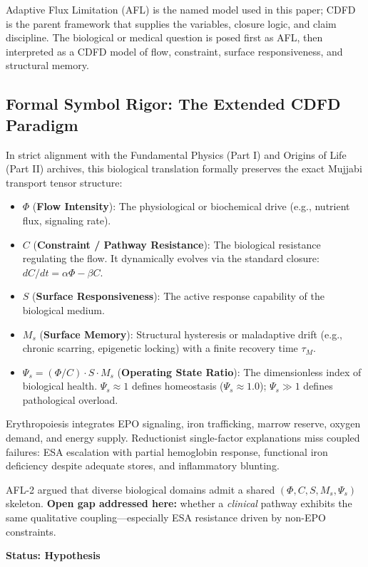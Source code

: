 \documentclass[11pt]{article}
\begin{document}
Adaptive Flux Limitation (AFL) is the named model used in this paper; CDFD is the parent framework that supplies the variables, closure logic, and claim discipline. The biological or medical question is posed first as AFL, then interpreted as a CDFD model of flow, constraint, surface responsiveness, and structural memory.

\subsection{Formal Symbol Rigor: The Extended CDFD Paradigm}
In strict alignment with the Fundamental Physics (Part I) and Origins of Life (Part II) archives, this biological translation formally preserves the exact Mujjabi transport tensor structure:
\begin{itemize}
    \item $\Phi$ (\textbf{Flow Intensity}): The physiological or biochemical drive (e.g., nutrient flux, signaling rate).
    \item $C$ (\textbf{Constraint / Pathway Resistance}): The biological resistance regulating the flow. It dynamically evolves via the standard closure: $dC/dt = \alpha \Phi - \beta C$.
    \item $S$ (\textbf{Surface Responsiveness}): The active response capability of the biological medium.
    \item $M_s$ (\textbf{Surface Memory}): Structural hysteresis or maladaptive drift (e.g., chronic scarring, epigenetic locking) with a finite recovery time $\tau_M$.
    \item $\Psi_s = (\Phi/C) \cdot S \cdot M_s$ (\textbf{Operating State Ratio}): The dimensionless index of biological health. $\Psi_s \approx 1$ defines homeostasis ($\Psi_s \approx 1.0$); $\Psi_s \gg 1$ defines pathological overload.
\end{itemize}

Erythropoiesis integrates EPO signaling, iron trafficking, marrow reserve, oxygen demand, and energy supply. Reductionist single-factor explanations miss coupled failures: ESA escalation with partial hemoglobin response, functional iron deficiency despite adequate stores, and inflammatory blunting.

AFL-2 argued that diverse biological domains admit a shared $(\Phi, C, S, M_s, \Psi_s)$ skeleton. \textbf{Open gap addressed here:} whether a \emph{clinical} pathway exhibits the same qualitative coupling---especially ESA resistance driven by non-EPO constraints.

\textbf{Status: Hypothesis}
\end{document}
